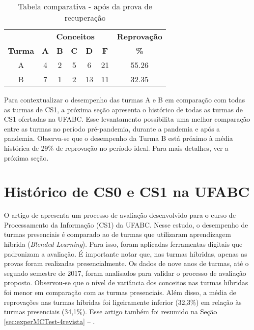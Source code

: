 \begin{table}[htbp]
    \centering
    \caption{Tabela comparativa - após da prova de recuperação}
    \label{tab:apos-recuperacao}
    \begin{tabular}{|c|c|c|c|c|c|c|}
      \hline
      \rowcolor[HTML]{EFEFEF} 
       & \multicolumn{5}{c|}{\cellcolor[HTML]{C0C0C0}\textbf{Conceitos}} & \cellcolor[HTML]{C0C0C0}\textbf{Reprovação} \\
      \cline{2-6} \cline{7-7}
      \rowcolor[HTML]{EFEFEF} 
      \textbf{Turma} & \textbf{A} & \textbf{B} & \textbf{C} & \textbf{D} & \textbf{F} & \textbf{\%} \\
      \hline
      A & 4 & 2 & 5 & 6 & 21 & 55.26 \\
      \hline
      B & 7 & 1 & 2 & 13 & 11 & 32.35 \\
      \hline
    \end{tabular}
\end{table}

Para contextualizar o desempenho das turmas A e B em comparação com todas as turmas de CS1, a próxima seção apresenta o histórico de todas as turmas de CS1 ofertadas na UFABC. Esse levantamento possibilita uma melhor comparação entre as turmas no período pré-pandemia, durante a pandemia e após a pandemia. Observa-se que o desempenho da Turma B está próximo à média histórica de 29\% de reprovação no período ideal. Para mais detalhes, ver a próxima seção.

\section{Histórico de CS0 e CS1 na UFABC}

O artigo de  apresenta um processo de avaliação desenvolvido para o curso de Processamento da Informação (CS1) da UFABC. Nesse estudo, o desempenho de turmas presenciais é comparado ao de turmas que utilizaram aprendizagem híbrida (\textit{Blended Learning}). Para isso, foram aplicadas ferramentas digitais que padronizam a avaliação. É importante notar que, nas turmas híbridas, apenas as provas foram realizadas presencialmente. Os dados de nove anos de turmas, até o segundo semestre de 2017, foram analisados para validar o processo de avaliação proposto. Observou-se que o nível de variância dos conceitos nas turmas híbridas foi menor em comparação com as turmas presenciais. Além disso, a média de reprovações nas turmas híbridas foi ligeiramente inferior (32,3\%) em relação às turmas presenciais (34,1\%). Esse artigo também foi resumido na Seção \ref{sec:experMCTest-4revista} -- .


